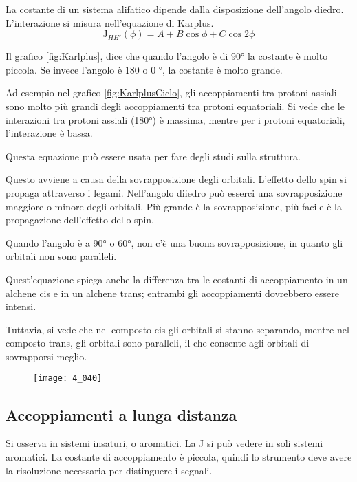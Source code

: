 La costante di un sistema alifatico dipende dalla disposizione dell'angolo diedro. L'interazione si misura nell'equazione di Karplus.
\[
  \text{J}_{HH'} (\phi) = A + B \cos \phi + C \cos 2\phi
\]


Il grafico \ref{fig:Karlplus}, dice che quando l'angolo è di 90° la costante è molto piccola. Se invece l'angolo è 180 o 0 °, la costante è molto grande.


Ad esempio nel grafico \ref{fig:KarlplusCiclo}, gli accoppiamenti tra protoni assiali sono molto più grandi degli accoppiamenti tra protoni equatoriali.
Si vede che le interazioni tra protoni assiali (180°) è massima, mentre per i protoni equatoriali, l'interazione è bassa. 

Questa equazione può essere usata per fare degli studi sulla struttura.

Questo avviene a causa della sovrapposizione degli orbitali. L'effetto dello spin si propaga attraverso i legami. Nell'angolo diiedro può esserci una sovrapposizione maggiore o minore degli orbitali. Più grande è la sovrapposizione, più facile è la propagazione dell'effetto dello spin.

Quando l'angolo è a 90° o 60°, non c'è una buona sovrapposizione, in quanto gli orbitali non sono paralleli.

Quest'equazione spiega anche la differenza tra le costanti di accoppiamento in un alchene cis e in un alchene trans; entrambi gli accoppiamenti dovrebbero essere intensi.

Tuttavia, si vede che nel composto cis gli orbitali si stanno separando, mentre nel composto trans, gli orbitali sono paralleli, il che consente agli orbitali di sovrapporsi meglio.

\begin{figure}
  \texttt{[image: 4\_040]}
\end{figure}

\subsection{Accoppiamenti a lunga distanza}

Si osserva in sistemi insaturi, o aromatici. La J si può vedere in soli sistemi aromatici. La costante di accoppiamento è piccola, quindi lo strumento deve avere la risoluzione necessaria per distinguere i segnali.

